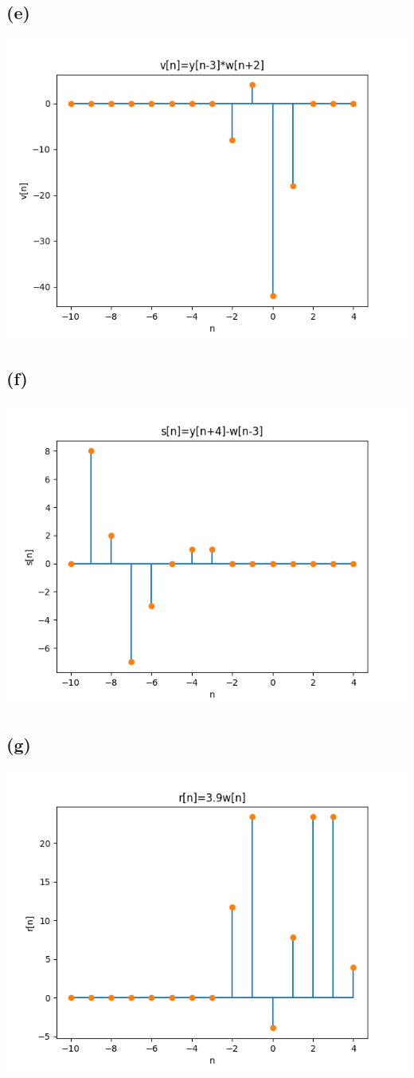 \subsection*{(e)}
\includegraphics[scale=0.5]{v.png}
\subsection*{(f)}
\includegraphics[scale=0.5]{s.png}
\subsection*{(g)}
\includegraphics[scale=0.5]{r.png}

